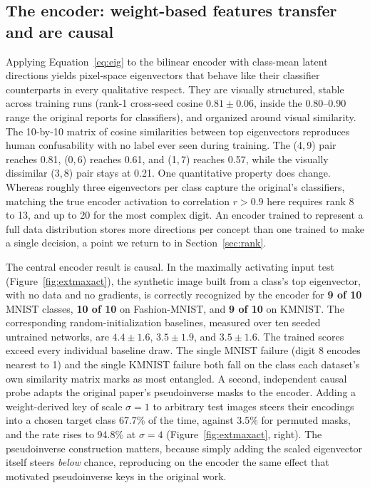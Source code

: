 \documentclass[10pt]{article} %
\begin{document}
\subsection{The encoder: weight-based features transfer and are causal}
\label{sec:enc}

Applying Equation~\ref{eq:eig} to the bilinear encoder with class-mean latent
directions yields pixel-space eigenvectors that behave like their classifier
counterparts in every qualitative respect. They are visually structured, stable
across training runs (rank-1 cross-seed cosine $0.81 \pm 0.06$, inside the
0.80--0.90 range the original reports for classifiers), and organized around visual
similarity. The 10-by-10 matrix of cosine similarities between top eigenvectors
reproduces human confusability with no label ever seen during training. The
(4,\,9) pair reaches 0.81, (0,\,6) reaches 0.61, and (1,\,7) reaches 0.57, while
the visually dissimilar (3,\,8) pair stays at 0.21. One quantitative property does
change. Whereas roughly three eigenvectors per class capture the original's
classifiers, matching the true encoder activation to correlation $r > 0.9$ here
requires rank 8 to 13, and up to 20 for the most complex digit. An encoder trained
to represent a full data distribution stores more directions per concept than one
trained to make a single decision, a point we return to in Section~\ref{sec:rank}.

The central encoder result is causal. In the maximally activating input test
(Figure~\ref{fig:extmaxact}), the synthetic image built from a class's top
eigenvector, with no data and no gradients, is correctly recognized by the encoder
for \textbf{9 of 10} MNIST classes, \textbf{10 of 10} on Fashion-MNIST, and
\textbf{9 of 10} on KMNIST. The corresponding random-initialization baselines,
measured over ten seeded untrained networks, are $4.4 \pm 1.6$, $3.5 \pm 1.9$, and
$3.5 \pm 1.6$. The trained scores exceed every individual baseline draw. The single
MNIST failure (digit 8 encodes nearest to 1) and the single KMNIST failure both fall
on the class each dataset's own similarity matrix marks as most entangled. A second,
independent causal probe adapts the original paper's pseudoinverse masks to the
encoder. Adding a weight-derived key of scale $\sigma = 1$ to arbitrary test images
steers their encodings into a chosen target class 67.7\% of the time, against 3.5\%
for permuted masks, and the rate rises to 94.8\% at $\sigma = 4$
(Figure~\ref{fig:extmaxact}, right). The pseudoinverse construction matters, because
simply adding the scaled eigenvector itself steers \emph{below} chance, reproducing
on the encoder the same effect that motivated pseudoinverse keys in the original
work.
\end{document}
